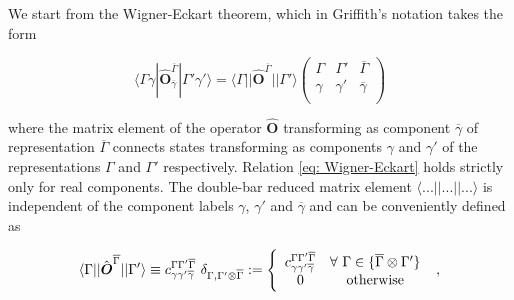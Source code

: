\documentclass[twocolumn,prb,twocolumn,amsmath,superscriptaddress,nofootinbib,amssymb]{revtex4-1}
\newcommand{\vect}[1]{\boldsymbol{#1}}
\begin{document}
\begin{widetext}




We start from the Wigner-Eckart theorem, which in Griffith's notation \cite{Griffith} takes the form

\begin{equation}\label{eq: Wigner-Eckart}
\langle \Gamma \gamma | \hat{\vect{O}}_{\overline{\gamma}}^{\overline{\Gamma}} |\Gamma'\gamma' \rangle =\langle \Gamma  || \hat{\vect{O}}^{\overline{\Gamma}} ||\Gamma'\rangle \left(
                                                                             \begin{array}{ccc}
                                                                               \Gamma & \Gamma' & \overline{\Gamma}\\
                                                                                \gamma& \gamma' & \overline{\gamma} \\
                                                                             \end{array}
                                                                           \right)
\end{equation}

\noindent
where the matrix element of the operator $\hat{\vect{O}}$ transforming as component $\overline{\gamma}$ of representation $\overline{\Gamma}$ connects states transforming as components $\gamma$ and $\gamma'$ of the representations $\Gamma$ and $\Gamma'$ respectively. Relation \ref{eq: Wigner-Eckart} holds strictly only for real components. The double-bar reduced matrix element $\langle ... ||...||... \rangle$ is independent of the component labels $\gamma$, $\gamma'$ and $\overline{\gamma}$ and can be conveniently defined as \cite{Griffith}

\begin{equation}
\langle \Gamma  || \hat{\vect{O}}^{\overline{\Gamma}} ||\Gamma'\rangle\equiv c^{\Gamma\Gamma'\overline{\Gamma}}_{\gamma\gamma'\overline{\gamma}}~\delta_{\Gamma, \Gamma' \otimes \overline{\Gamma}}:=\left\{\begin{array}{cc}
c^{\Gamma\Gamma'\overline{\Gamma}}_{\gamma\gamma'\overline{\gamma}} & \forall ~\Gamma \in \{\overline{\Gamma}\otimes \Gamma'\} \\
                                                                         0 & \textnormal{otherwise}
                                                                       \end{array}
                                                                       \right.~,
\end{equation}


\end{widetext}
\end{document}
